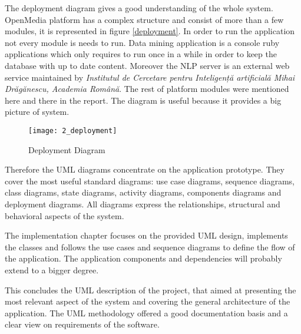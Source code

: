 The deployment diagram gives a good understanding of the whole system. OpenMedia platform has a complex structure and consist of more than a few modules, it is represented in figure \ref{deployment}. In order to run the application not every module is needs to run. Data mining application is a console ruby applications which only requires to run once in a while in order to keep the database with up to date content. Moreover the NLP server is an external web service maintained by \emph{Institutul de Cercetare pentru Inteligență artificială Mihai Drăgănescu, Academia Română}. The rest of platform modules were mentioned here and there in the report. The diagram is useful because it provides a big picture of system.

\begin{figure}[!ht]
\centering
\texttt{[image: 2\_deployment]}
\caption{Deployment Diagram}\label{demployment}
\end{figure}
\clearpage

Therefore the UML diagrams concentrate on the application prototype. They cover the most useful standard diagrams: use case diagrams, sequence diagrams, class diagrams, state diagrams, activity diagrams, components diagrams and deployment diagrams. All diagrams express the relationships, structural and behavioral aspects of the system.

The implementation chapter focuses on the provided UML design, implements the classes and follows the use cases and sequence diagrams to define the flow of the application. The application components and dependencies will probably extend to a bigger degree.

This concludes the UML description of the project, that aimed at presenting the most relevant aspect of the system and covering the general architecture of the application. The UML methodology offered a good documentation basis and a clear view on requirements of the software.